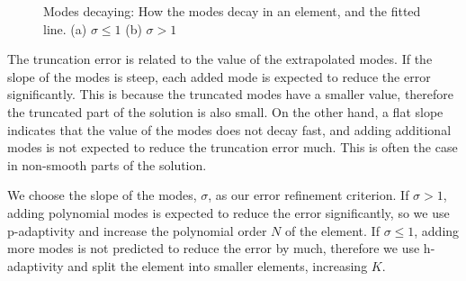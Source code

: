 \begin{figure}[H]
	\centering
	\hfill
	\caption{Modes decaying: How the modes decay in an element, and the fitted line. (a) \(\sigma \leqslant 1\) (b) \(\sigma > 1\)}\label{fig:decaying_modes}
\end{figure}

The truncation error is related to the value of the extrapolated modes. If the slope of the modes is
steep, each added mode is expected to reduce the error significantly. This is because the truncated modes
have a smaller value, therefore the truncated part of the solution is also small. On the other hand,
a flat slope indicates that the value of the modes does not decay fast, and adding additional modes
is not expected to reduce the truncation error much. This is often the case in non-smooth parts of
the solution.

We choose the slope of the modes, \(\sigma \), as our error refinement criterion. If \(\sigma > 1\),
adding polynomial modes is expected to reduce the error significantly, so we use p-adaptivity and
increase the polynomial order \(N\) of the element. If \(\sigma \leqslant 1\), adding more modes is
not predicted to reduce the error by much, therefore we use h-adaptivity and split the element into
smaller elements, increasing \(K\).

